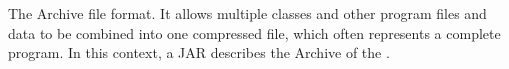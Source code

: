 \item[JAR]{
\label{jar}
The \texttrademark  Archive file format. It allows multiple classes and other program files and data to be combined into one compressed file, which often represents a complete program.
In this context, a JAR describes the \texttrademark
  Archive of the \gdaut.
}
